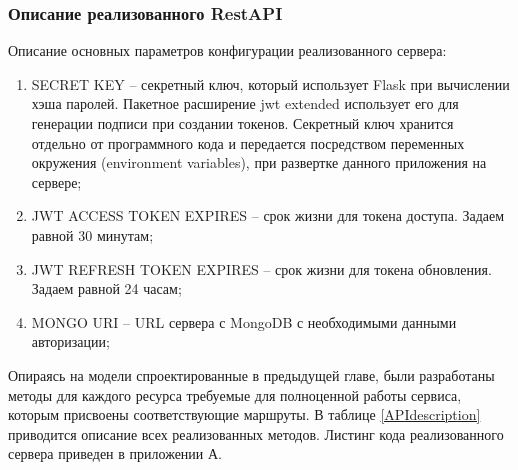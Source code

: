 \subsubsection{Описание реализованного RestAPI}
Описание основных параметров конфигурации реализованного сервера:
\begin{enumerate}
	\item SECRET KEY -- секретный ключ, который использует Flask при
	вычислении хэша паролей. Пакетное расширение jwt extended использует его для генерации подписи при создании токенов. Секретный ключ хранится отдельно от программного кода и передается посредством переменных окружения (environment variables), при развертке данного приложения на сервере;
	\item JWT ACCESS TOKEN EXPIRES -- срок жизни для токена доступа.  Задаем равной 30 минутам;
	\item JWT REFRESH TOKEN EXPIRES -- срок жизни для токена обновления. Задаем равной 24 часам;
	\item MONGO URI -- URL сервера с MongoDB с необходимыми
	данными авторизации;
\end{enumerate}

Опираясь на модели спроектированные в предыдущей главе, были разработаны методы для каждого ресурса требуемые для полноценной работы сервиса, которым присвоены соответствующие маршруты. В таблице \ref{APIdescription} приводится описание всех реализованных методов. Листинг кода реализованного сервера приведен в приложении А.  

